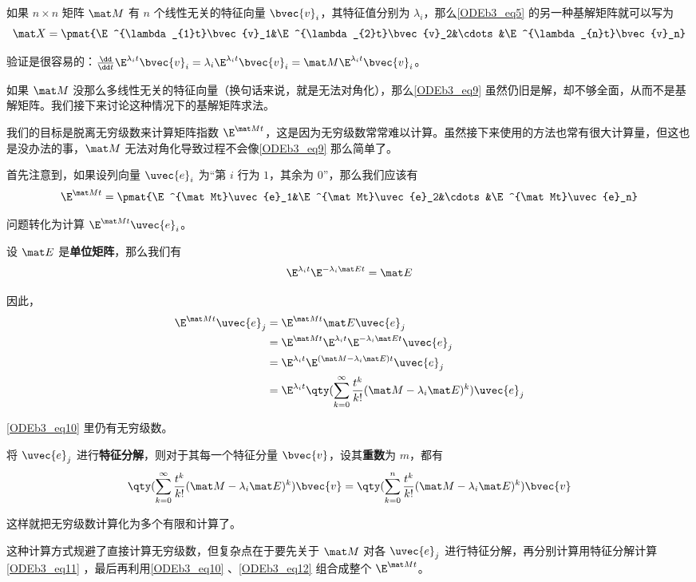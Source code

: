 如果 $n\times n$ 矩阵 $\mat M$ 有 $n$ 个线性无关的特征向量 $\bvec{v}_i$，其特征值分别为 $\lambda_i$，那么\autoref{ODEb3_eq5} 的另一种基解矩阵就可以写为
\begin{equation}\label{ODEb3_eq9}
\mat X=\pmat{\E^{\lambda_{1}t}\bvec{v}_1&\E^{\lambda_{2}t}\bvec{v}_2&\cdots&\E^{\lambda_{n}t}\bvec{v}_n}
\end{equation}

验证是很容易的：$\frac{\dd}{\dd t}\E^{\lambda_{i}t}\bvec{v}_i=\lambda_i\E^{\lambda_{i}t}\bvec{v}_i=\mat M\E^{\lambda_{i}t}\bvec{v}_i$。

如果 $\mat M$ 没那么多线性无关的特征向量（换句话来说，就是无法对角化），那么\autoref{ODEb3_eq9} 虽然仍旧是解，却不够全面，从而不是基解矩阵。我们接下来讨论这种情况下的基解矩阵求法。

我们的目标是脱离无穷级数来计算矩阵指数 $\E^{\mat Mt}$，这是因为无穷级数常常难以计算。虽然接下来使用的方法也常有很大计算量，但这也是没办法的事，$\mat M$ 无法对角化导致过程不会像\autoref{ODEb3_eq9} 那么简单了。

首先注意到，如果设列向量 $\uvec{e}_i$ 为“第 $i$ 行为 $1$，其余为 $0$”，那么我们应该有
\begin{equation}\label{ODEb3_eq12}
\E^{\mat Mt}=\pmat{\E^{\mat Mt}\uvec{e}_1&\E^{\mat Mt}\uvec{e}_2&\cdots&\E^{\mat Mt}\uvec{e}_n}
\end{equation}

问题转化为计算 $\E^{\mat Mt}\uvec{e}_i$。

设 $\mat E$ 是\textbf{单位矩阵}，那么我们有
\begin{equation}
\E^{\lambda_it}\E^{-\lambda_i\mat Et}=\mat E
\end{equation}

因此，
\begin{equation}\label{ODEb3_eq10}
\begin{aligned}
\E^{\mat Mt}\uvec{e}_j&=\E^{\mat Mt}\mat E\uvec{e}_j\\
&=\E^{\mat Mt}\E^{\lambda_it}\E^{-\lambda_i\mat Et}\uvec{e}_j\\
&=\E^{\lambda_it}\E^{(\mat M-\lambda_i\mat E)t}\uvec{e}_j\\
&=\E^{\lambda_it}\qty(\sum_{k=0}^\infty \frac{t^k}{k!}(\mat M-\lambda_i\mat E)^k)\uvec{e}_j
\end{aligned}
\end{equation}

\autoref{ODEb3_eq10} 里仍有无穷级数。

将 $\uvec{e}_j$ 进行\textbf{特征分解}，则对于其每一个特征分量 $\bvec{v}$，设其\textbf{重数}为 $m$，都有
\begin{equation}\label{ODEb3_eq11}
\qty(\sum_{k=0}^\infty \frac{t^k}{k!}(\mat M-\lambda_i\mat E)^k)\bvec{v}=\qty(\sum_{k=0}^n \frac{t^k}{k!}(\mat M-\lambda_i\mat E)^k)\bvec{v}
\end{equation}

这样就把无穷级数计算化为多个有限和计算了。

这种计算方式规避了直接计算无穷级数，但复杂点在于要先关于 $\mat M$ 对各 $\uvec{e}_j$ 进行特征分解，再分别计算用特征分解计算\autoref{ODEb3_eq11} ，最后再利用\autoref{ODEb3_eq10} 、\autoref{ODEb3_eq12} 组合成整个 $\E^{\mat Mt}$。









